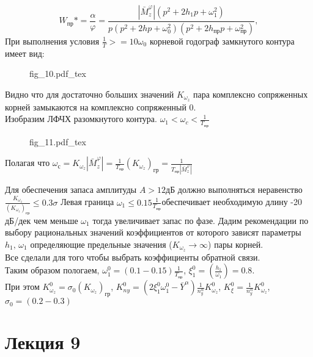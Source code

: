 \documentclass{article}
\begin{document}
\[
	W_\text{пр}* = {\frac{\alpha}{\varphi}} = \frac{|\bar{M}_z^\varphi| (p^2 + 2h_1 p + \omega_1^2)} {p(p^2 + 2 hp + \omega_0^2) (p^2 + 2h_\text{пр}p + \omega_\text{пр}^2)},
\]
При выполнения условия $\frac{1}{T} >= 10 \omega_0$ корневой годограф замкнутого контура имеет вид:\\
\begin{figure}[H]
	\centering
	{fig_10.pdf_tex}
\end{figure}
Видно что для достаточно больших значений $K_{\omega_z}$ пара комплексно сопряженных корней замыкаются на комплексно сопряженный 0.\\
Изобразим ЛФЧХ разомкнутого контура.
$\omega_1 < \omega_c < \frac{1}{T_\text{пр}}$

\begin{figure}[H]
	\centering
	{fig_11.pdf_tex}
\end{figure}


Полагая что $\omega_\text{с} = K_{\omega_z} | \bar{M}_z^\varphi| = \frac{1}{T_\text{пр}}
	(K_{\omega_z})_\text{гр} = \frac{1}{T_\text{пр}|\bar{M}_z^\varphi|}$

Для обеспечения запаса амплитуды $A > 12 \text{дБ}$ должно выполняться неравенство $\frac{K_{\omega_z}}{(K_{\omega_z})_\text{гр}} \leq 0.3 \sigma $
Левая граница $\omega_1 \leq 0.15 \frac{1}{T_\text{пр}}$обеспечивает необходимую длину -20 дБ/дек чем меньше $\omega_1$ тогда увеличивает запас по фазе.
Дадим рекомендации по выбору рациональных значений коэффициентов от которого зависят параметры $h_1, \, \omega_1$ определяющие предельные значения ($K_{\omega_z} \rightarrow\infty$) пары корней.\\
Все сделали для того чтобы выбрать коэффициенты обратной связи. \\ 
Таким образом пологаем, $\omega_1^0 = (0.1 - 0.15) \frac{1}{T_\text{пр}}$, $\xi_1^0 = (\frac{h_1}{\omega_1}) = 0.8$.\\
При этом $K_{\omega_z}^0 = \sigma_0 (K_{\omega_z})_\text{гр}$, $K_{ny}^0 = (2\xi_1^0 \omega_1^0 - \bar{Y}^\alpha) \frac{1}{n_y^\alpha} K_{\omega_z}^0$, $K_{\xi}^0 = \frac{1}{n_y^\alpha} K_{\omega_z}^0$, $\sigma_0 = (0.2 - 0.3)$
\newpage
\section{Лекция 9}
\end{document}
